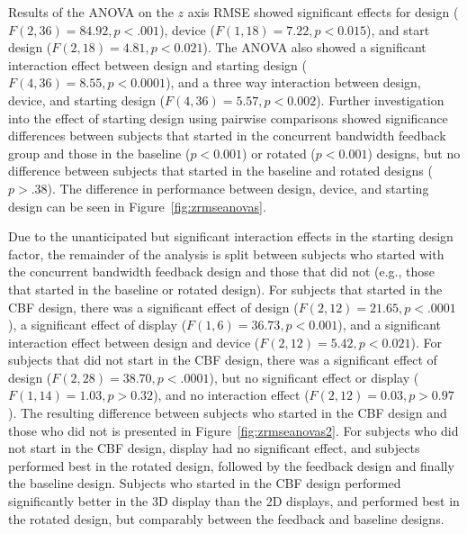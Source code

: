 Results of the ANOVA on the $z$ axis RMSE showed significant effects for design ($F(2, 36)=84.92, p<.001$), device ($F(1, 18)=7.22, p<0.015$), and start design ($F(2, 18)=4.81, p<0.021$).
The ANOVA also showed a significant interaction effect between design and starting design ($F(4, 36)=8.55, p<0.0001$), and a three way interaction between design, device, and starting design ($F(4, 36)=5.57, p<0.002$).
Further investigation into the effect of starting design using pairwise comparisons showed significance differences between subjects that started in the concurrent bandwidth feedback group and those in the baseline ($p<0.001$) or rotated ($p<0.001$) designs, but no difference between subjects that started in the baseline and rotated designs ($p>.38$).
The difference in performance between design, device, and starting design can be seen in Figure~\ref{fig:zrmseanovas}.

Due to the unanticipated but significant interaction effects in the starting design factor, the remainder of the analysis is split between subjects who started with the concurrent bandwidth feedback design and those that did not (e.g., those that started in the baseline or rotated design).
For subjects that started in the CBF design, there was a significant effect of design ($F(2, 12)=21.65, p<.0001$), a significant effect of display ($F(1, 6)=36.73, p<0.001$), and a significant interaction effect between design and device ($F(2, 12)=5.42, p<0.021$).
For subjects that did not start in the CBF design, there was a significant effect of design ($F(2, 28)=38.70, p<.0001$), but no significant effect or display ($F(1, 14)=1.03, p>0.32$), and no interaction effect ($F(2, 12)=0.03, p>0.97$).
The resulting difference between subjects who started in the CBF design and those who did not is presented in Figure~\ref{fig:zrmseanovas2}.
For subjects who did not start in the CBF design, display had no significant effect, and subjects performed best in the rotated design, followed by the feedback design and finally the baseline design.
Subjects who started in the CBF design performed significantly better in the 3D display than the 2D displays, and performed best in the rotated design, but comparably between the feedback and baseline designs.

